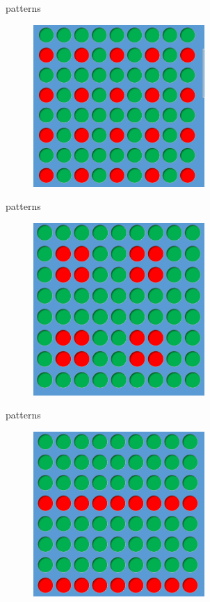 \documentclass[11pt,compress,xcolor=x11names,UTF8]{beamer}
\begin{document}
\begin{frame}{patterns}
\begin{figure}
\centering
\includegraphics[width=0.58\textwidth]{pat1} %
\end{figure}

\end{frame}
\begin{frame}{patterns}
\begin{figure}
\centering
\includegraphics[width=0.58\textwidth]{pat2} %
\end{figure}

\end{frame}
\begin{frame}{patterns}
\begin{figure}
\centering
\includegraphics[width=0.58\textwidth]{pat3} %
\end{figure}

\end{frame}
\end{document}
